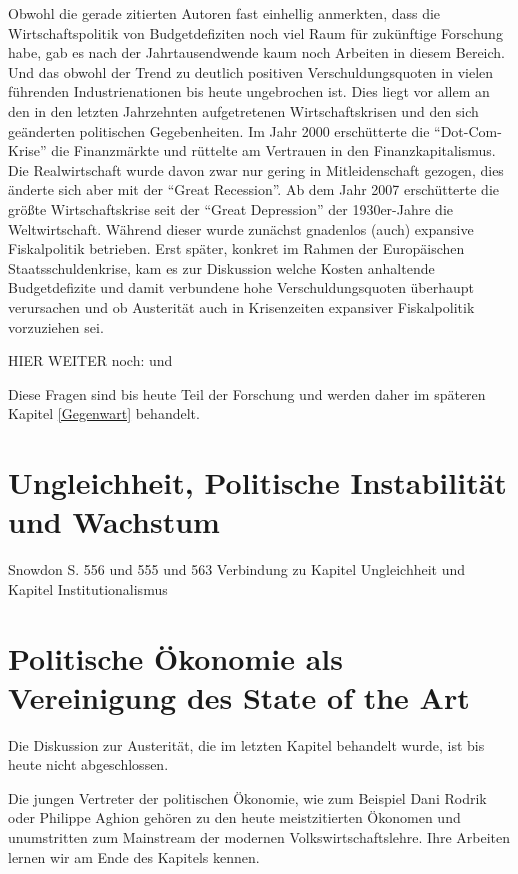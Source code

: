 Obwohl die gerade zitierten Autoren fast einhellig anmerkten, dass die Wirtschaftspolitik von Budgetdefiziten noch viel Raum für zukünftige Forschung habe, gab es nach der Jahrtausendwende kaum noch Arbeiten in diesem Bereich. Und das obwohl der Trend zu deutlich positiven Verschuldungsquoten in vielen führenden Industrienationen bis heute ungebrochen ist. Dies liegt vor allem an den in den letzten Jahrzehnten aufgetretenen Wirtschaftskrisen und den sich geänderten politischen Gegebenheiten. Im Jahr 2000 erschütterte die "`Dot-Com-Krise"' die Finanzmärkte und rüttelte am Vertrauen in den Finanzkapitalismus. Die Realwirtschaft wurde davon zwar nur gering in Mitleidenschaft gezogen, dies änderte sich aber mit der "`Great Recession"'. Ab dem Jahr 2007 erschütterte die größte Wirtschaftskrise seit der "`Great Depression"' der 1930er-Jahre die Weltwirtschaft. Während dieser wurde zunächst gnadenlos (auch) expansive Fiskalpolitik betrieben. Erst später, konkret im Rahmen der Europäischen Staatsschuldenkrise, kam es zur Diskussion welche Kosten anhaltende Budgetdefizite und damit verbundene hohe Verschuldungsquoten überhaupt verursachen und ob Austerität auch in Krisenzeiten expansiver Fiskalpolitik vorzuziehen sei.

HIER WEITER noch: \parencite{Alesina2000} und \textcite{Yared2019}


Diese Fragen sind bis heute Teil der Forschung und werden daher im späteren Kapitel \ref{Gegenwart} behandelt.


\section{Ungleichheit, Politische Instabilität und Wachstum}


Snowdon S. 556 und 555 und 563 Verbindung zu Kapitel Ungleichheit und Kapitel Institutionalismus

\textcite{Alesina1996}
\textcite{Alesina1994}
\textcite{Deininger1996}
\textcite{Aghion1999}
\textcite{Hirschman1973}
\textcite{Alesina1994a}




\section{Politische Ökonomie als Vereinigung des State of the Art}
\label{Aghion}

Die Diskussion zur Austerität, die im letzten Kapitel behandelt wurde, ist bis heute nicht abgeschlossen. 

Die jungen Vertreter der politischen Ökonomie, wie zum Beispiel Dani Rodrik oder Philippe Aghion gehören zu den heute meistzitierten Ökonomen und unumstritten zum Mainstream der modernen Volkswirtschaftslehre. Ihre Arbeiten lernen wir am Ende des Kapitels kennen. 


